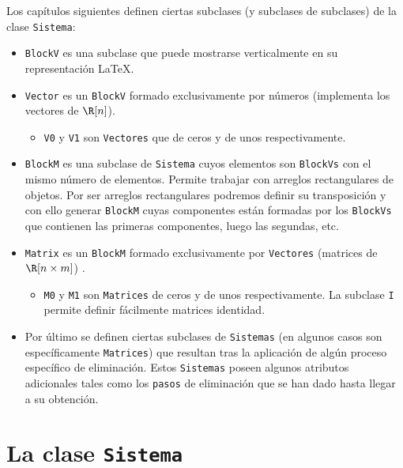 \documentclass[11pt]{report}
\begin{document}
Los capítulos siguientes definen ciertas subclases (y subclases de subclases) de la clase \texttt{Sistema}:

\begin{itemize}
\item \texttt{BlockV} es una subclase que puede mostrarse verticalmente en su representación \LaTeX{}.

\item \texttt{Vector} es un \texttt{BlockV} formado exclusivamente por números (implementa los vectores de \(\R[n]\)).

\begin{itemize}
\item \texttt{V0} y \texttt{V1} son \texttt{Vectores} que de ceros y de unos respectivamente.
\end{itemize}

\item \texttt{BlockM} es una subclase de \texttt{Sistema} cuyos elementos son \texttt{BlockVs} con el mismo número de
elementos. Permite trabajar con arreglos rectangulares de objetos. Por ser arreglos rectangulares
podremos definir su transposición y con ello generar \texttt{BlockM} cuyas componentes están formadas por
los \texttt{BlockVs} que contienen las primeras componentes, luego las segundas, etc.

\item \texttt{Matrix} es un \texttt{BlockM} formado exclusivamente por \texttt{Vectores} (matrices de \(\R[n\times m]\)) .

\begin{itemize}
\item \texttt{M0} y \texttt{M1} son \texttt{Matrices} de ceros y de unos respectivamente. La subclase \texttt{I} permite definir
fácilmente matrices identidad.
\end{itemize}

\item Por último se definen ciertas subclases de \texttt{Sistemas} (en algunos casos son específicamente
\texttt{Matrices}) que resultan tras la aplicación de algún proceso específico de eliminación. Estos
\texttt{Sistemas} poseen algunos atributos adicionales tales como los \texttt{pasos} de eliminación que se han
dado hasta llegar a su obtención.
\end{itemize}


\chapter{La clase \texttt{Sistema}}
\label{sec:org39a2e79}
\end{document}

